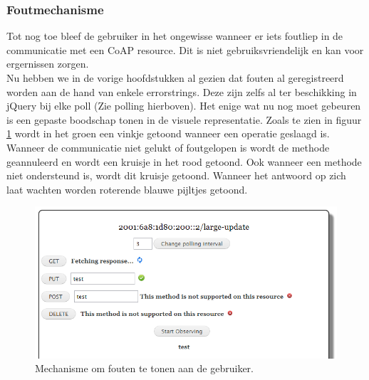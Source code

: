 \subsubsection{Foutmechanisme} \label{foutmechanisme}
Tot nog toe bleef de gebruiker in het ongewisse wanneer er iets foutliep in de communicatie met een CoAP resource. Dit is niet gebruiksvriendelijk en kan voor ergernissen zorgen.\\
Nu hebben we in de vorige hoofdstukken al gezien dat fouten al geregistreerd worden aan de hand van enkele errorstrings. Deze zijn zelfs al ter beschikking in jQuery bij elke poll (Zie polling hierboven). Het enige wat nu nog moet gebeuren is een gepaste boodschap tonen in de visuele representatie. Zoals te zien in figuur \ref{fig:foutmechanisme} wordt in het groen een vinkje getoond wanneer een operatie geslaagd is. Wanneer de communicatie niet gelukt of foutgelopen is wordt de methode geannuleerd en wordt een kruisje in het rood getoond. Ook wanneer een methode niet ondersteund is, wordt dit kruisje getoond. Wanneer het antwoord op zich laat wachten worden roterende blauwe pijltjes getoond.

\begin{figure}[h!]
\centering
\includegraphics[width=1\textwidth]{fig/foutmechanisme}
\caption{Mechanisme om fouten te tonen aan de gebruiker.}
\label{fig:foutmechanisme}
\end{figure}

